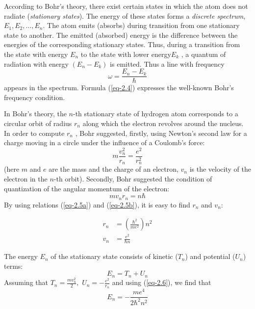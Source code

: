 \documentclass[a4paper,sfsidenotes,colorlinks=true]{tufte-book}
\numberwithin{equation}{section}
\numberwithin{figure}{section}
\begin{document}
According to Bohr's theory, there exist certain states in which the
atom does not radiate (\emph{stationary states}). The energy of these
states forms a \emph{discrete spectrum}, $E_{1}, E_{2}, \ldots,
E_{n}$. The atom emits (absorbs) during transition from one stationary
state to another. The emitted (absorbed) energy is the difference
between the energies of the corresponding stationary states. Thus,
during a transition from the state with energy $E_{n}$ to the state with
lower energy$ E_{k}$ , a quantum of radiation with energy $(E_{n} - E_{k})$ is
emitted. Thus a line with frequency 
\begin{equation}%
\omega = \frac{E_{n}- E_{k}}{\hbar} 
\label{eq-2.4}
\end{equation}
appears in the spectrum. Formula (\ref{eq-2.4}) expresses the
well-known Bohr's frequency condition.

In Bohr's theory, the $n$-th stationary state of hydrogen
atom corresponds to a circular orbit of radius $r_{n}$ along which the
electron revolves around the nucleus. In order to compute $r_{n}$ , Bohr
suggested, firstly, using Newton's second law for a charge moving in a
circle under the influence of a Coulomb's force: 
\begin{equation}%
m \frac{v_{n}^{2}}{r_{n}} = \frac{e^{2}}{r_{n}^{2}}
\tag{2.5a}
\label{eq-2.5a} 
\end{equation}
(here $m$ and $e$ are the mass and the charge of an electron,
$v_{n}$ is the velocity of the electron in the $n$-th
orbit). Secondly, Bohr suggested the condition of quantization of the
angular momentum of the electron: 
\begin{equation}%
  m v_{n} r_{n} = n \hbar
\tag{2.5b}
\label{eq-2.5b} 
\end{equation}
By using relations (\ref{eq-2.5a}) and (\ref{eq-2.5b}), it is easy to
find $r_{n}$ and $v_{n}$:
\addtocounter{equation}{1}
\begin{equation}%
\begin{split}
r_{n} & = \left( \frac{\hbar^{2}}{me^{2}} \right) n^{2}\\
v_{n} & = \frac{e^{2}}{\hbar n}
\end{split}
\label{eq-2.6} 
\end{equation}

The energy $E_{n}$ of the stationary state consists of kinetic ($T_{n}$) and
potential ($U_{n}$) terms: 
\begin{equation*}
E_{n} = T_{n} + U_{n}
\end{equation*}
Assuming that $T_{n} = \frac{mv_{n}^{2}}{2}, \,\, U_{n} =
-\frac{e^{2}}{r_{n}}$ and using (\ref{eq-2.6}), we find that
\begin{equation}%
E_{n} = - \frac{me^{4}}{2 \hbar^{2} n^{2}}
\label{eq-2.7}
\end{equation}
\end{document}
